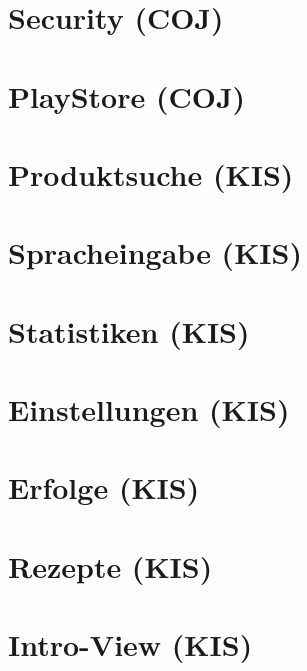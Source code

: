 \documentclass[
    headings=optiontotocandhead,%
    twoside,
    numbers=noenddot,%
    toc=flat, %
    12pt, %
    titlepage, %
    parskip=full, %
    listof=totoc, %
    listof=flat, %
    numbers=noenddot, %
    bibliography=totoc, %
    a4paper,DIV=14,
    BCOR=15mm,
]{scrbook}
\begin{document}
\chapter{Security (COJ)}
\renewcommand{\kapitelautor}{Autor: Filip Coja}


\chapter{PlayStore (COJ)}
\renewcommand{\kapitelautor}{Autor: Filip Coja}


\chapter{Produktsuche (KIS)}
\renewcommand{\kapitelautor}{Autor: Daniel Kisling}


\chapter{Spracheingabe (KIS)}
\renewcommand{\kapitelautor}{Autor: Daniel Kisling}

\chapter{Statistiken (KIS)}
\renewcommand{\kapitelautor}{Autor: Daniel Kisling}

\chapter{Einstellungen (KIS)}
\renewcommand{\kapitelautor}{Autor: Daniel Kisling}


\chapter{Erfolge (KIS)}
\renewcommand{\kapitelautor}{Autor: Daniel Kisling}

\chapter{Rezepte (KIS)}
\renewcommand{\kapitelautor}{Autor: Daniel Kisling}

\chapter{Intro-View (KIS)}
\renewcommand{\kapitelautor}{Autor: Daniel Kisling}
\end{document}
